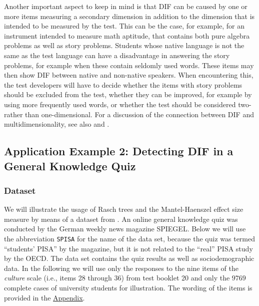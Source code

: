 \documentclass[doc,floatsintext,natbib]{apa7}
\begin{document}
Another important aspect to keep in mind is that DIF can be caused by one or more items measuring a secondary dimension in addition to the dimension that is intended to be measured by the test. This can be the case, for example, for an instrument intended to measure math aptitude, that contains both pure algebra problems as well as story problems. Students whose native language is not the same as the test language can have a disadvantage in answering the story problems, for example when these contain seldomly used words. These items may then show DIF between native and non-native speakers. When encountering this, the test developers will have to decide whether the items with story problems should be excluded from the test, whether they can be improved, for example by using more frequently used words, or whether the test should be considered two- rather than one-dimensional. For a discussion of the connection between DIF and multidimensionality, see also \cite{Ack:1992} and \cite{Stretal:2021:APM}.



\subsection{Application Example 2: Detecting DIF in a General Knowledge Quiz}
\label{sec:TutorialRasch}


\subsubsection{Dataset}

We will illustrate the usage of Rasch trees and the Mantel-Haenszel effect size measure by means of a dataset from \citet{SPISA:book}. An online general knowledge quiz was conducted by the German
weekly news magazine SPIEGEL. Below we will use the abbreviation \texttt{SPISA} for the name of the data set, because the quiz was termed ``students' PISA'' by the magazine, but it is not related to the ``real'' PISA study by the OECD. The data set contains the quiz results as well as sociodemographic data. In the following we will use only the responses to the nine items of the \textit{culture} scale (i.e., items 28 through 36) from test booklet 20 and only the $9769$ complete cases of university students for illustration. The wording of the items is provided in the \hyperref[sec:AppendixA]{Appendix}.
\end{document}
